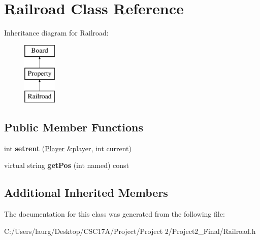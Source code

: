 \hypertarget{class_railroad}{}\section{Railroad Class Reference}
\label{class_railroad}
Inheritance diagram for Railroad\+:\begin{figure}[H]
\begin{center}
\leavevmode
\includegraphics[height=3.000000cm]{class_railroad}
\end{center}
\end{figure}
\subsection*{Public Member Functions}
\begin{DoxyCompactItemize}
\item 
\mbox{\label{class_railroad_a484c95e6479fec5cc20e317554c8d1b7}} 
int {\bfseries setrent} (\hyperlink{class_player}{Player} \&player, int current)
\item 
\mbox{\label{class_railroad_a7c0c4afa3aaaf47af9120ab23512983e}} 
virtual string {\bfseries get\+Pos} (int named) const
\end{DoxyCompactItemize}
\subsection*{Additional Inherited Members}


The documentation for this class was generated from the following file\+:\begin{DoxyCompactItemize}
\item 
C\+:/\+Users/laurg/\+Desktop/\+C\+S\+C17\+A/\+Project/\+Project 2/\+Project2\+\_\+\+Final/Railroad.\+h\end{DoxyCompactItemize}

